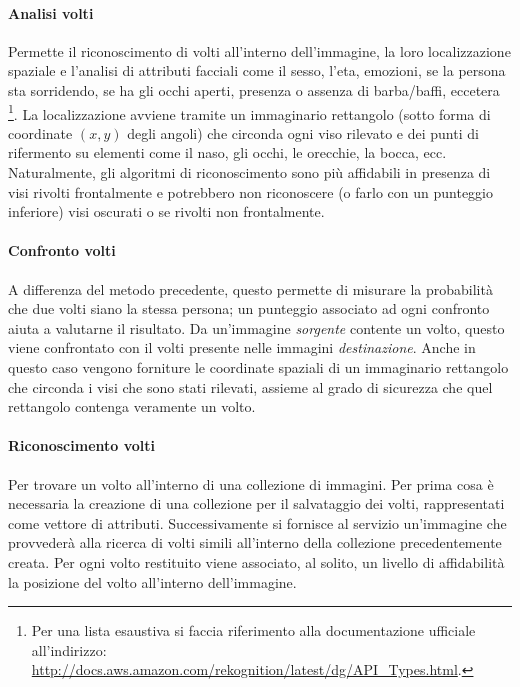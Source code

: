 \paragraph{Analisi volti} Permette il riconoscimento di volti all'interno dell'immagine, la loro localizzazione spaziale e l'analisi di attributi facciali come
il sesso, l'eta, emozioni, se la persona sta sorridendo, se ha gli occhi aperti, presenza o assenza di barba/baffi, eccetera
\footnote{Per una lista esaustiva si faccia riferimento alla documentazione ufficiale all'indirizzo: \url{http://docs.aws.amazon.com/rekognition/latest/dg/API_Types.html}.}.
La localizzazione avviene tramite un immaginario rettangolo (sotto forma di coordinate $(x, y)$ degli angoli) che circonda ogni viso rilevato e dei punti di rifermento su elementi come il naso,
gli occhi, le orecchie, la bocca, ecc.
Naturalmente, gli algoritmi di riconoscimento sono più affidabili in presenza di visi rivolti frontalmente e potrebbero non riconoscere (o farlo con un punteggio inferiore) visi oscurati
o se rivolti non frontalmente.

\paragraph{Confronto volti} A differenza del metodo precedente, questo permette di misurare la probabilità che due volti siano la stessa persona; un punteggio associato ad ogni confronto
aiuta a valutarne il risultato.
Da un'immagine \textit{sorgente} contente un volto, questo viene confrontato con il volti presente nelle immagini \textit{destinazione}.
Anche in questo caso vengono forniture le coordinate spaziali di un immaginario rettangolo che circonda i visi che sono stati rilevati, assieme al grado di sicurezza che quel rettangolo contenga veramente un volto.

\paragraph{Riconoscimento volti} Per trovare un volto all'interno di una collezione di immagini. Per prima cosa è necessaria la creazione di una collezione per il salvataggio dei volti, rappresentati come vettore di attributi.
Successivamente si fornisce al servizio un'immagine che provvederà alla ricerca di volti simili all'interno della collezione precedentemente creata.
Per ogni volto restituito viene associato, al solito, un livello di affidabilità la posizione del volto all'interno dell'immagine.


